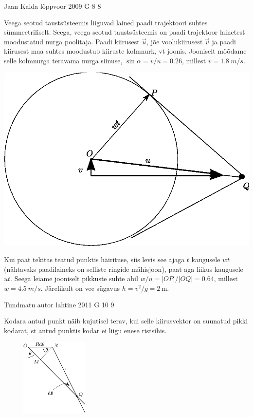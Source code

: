 \documentclass[11pt]{article}
\begin{document}
{%
{Jaan Kalda} %
{lõppvoor} %
{2009} %
{G 8} %
{8} %
{

\ifSolution
\osa
Veega seotud taustsüsteemis liiguvad lained paadi trajektoori suhtes sümmeetriliselt. Seega, veega seotud taustsüsteemis on
paadi trajektoor lainetest moodustatud nurga poolitaja. Paadi kiirusest $\vec u$, jõe voolukiirusest $\vec v$ ja paadi kiirusest maa suhtes moodustub kiiruste kolmnurk, vt joonis.
Jooniselt mõõdame selle kolmnurga teravama nurga siinuse, $\sin \alpha =v/u=\num{0.26}$, millest $v=\SI{1.8}{m/s}$.

\includegraphics[width=0.8\linewidth]{2009-v3g-08-paatlah.eps}

\osa
Kui paat tekitas teatud punktis häirituse, siis levis see ajaga $t$ kaugusele $wt$ (nähtavaks paadilaineks on selliste ringide mähisjoon),
paat aga liikus kaugusele $ut$. Seega leiame jooniselt pikkuste suhte abil $w/u=|OP|/|OQ|=\num{0.64}$, millest $w=\SI{4.5}{m/s}$. Järelikult on vee sügavus
$h=v^2/g=2\,$m.
\fi
}

{Tundmatu autor} %
{lahtine} %
{2011} %
{G 10} %
{9} %
{

\ifSolution
Kodara antud punkt näib kujutisel terav, kui selle kiirusvektor on suunatud pikki kodarat, st antud punktis kodar ei liigu enese ristsihis.

\begin{figure}
	\vspace*{-15pt}
	\includegraphics[width=0.3\textwidth]{2011-lahg-10-kodar_a}
	\vspace*{-25pt}
\end{figure}

}}
\end{document}
